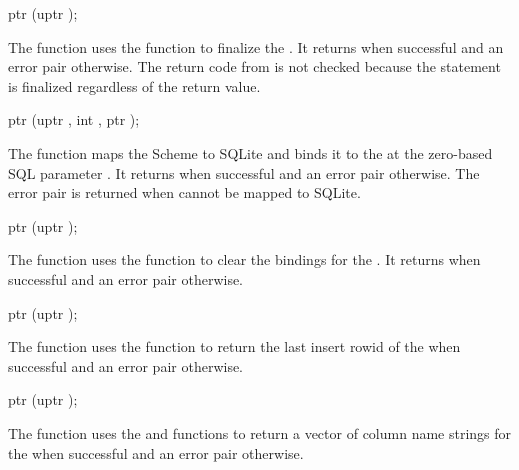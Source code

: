 \begin{function}
  ptr (uptr );
\end{function}

The  function uses the
 function to finalize the .  It
returns  when successful and an error pair otherwise. The
return code from  is not checked because the
statement is finalized regardless of the return value.

\begin{function}
  ptr (uptr , int , ptr );
\end{function}

The  function maps the Scheme 
to SQLite and binds it to the  at the zero-based SQL
parameter .  It returns  when successful and an
error pair otherwise. The error pair  is returned when  cannot be
mapped to SQLite.

\begin{function}
  ptr (uptr );
\end{function}

The  function uses the
 function to clear the bindings for the
. It returns  when successful and an error
pair otherwise.

\begin{function}
  ptr (uptr );
\end{function}

The  function uses the
 function to return the last insert
rowid of the  when successful and an error pair
otherwise.

\begin{function}
  ptr (uptr );
\end{function}

The  function uses the
 and 
functions to return a vector of column name strings for the
 when successful and an error pair otherwise.

